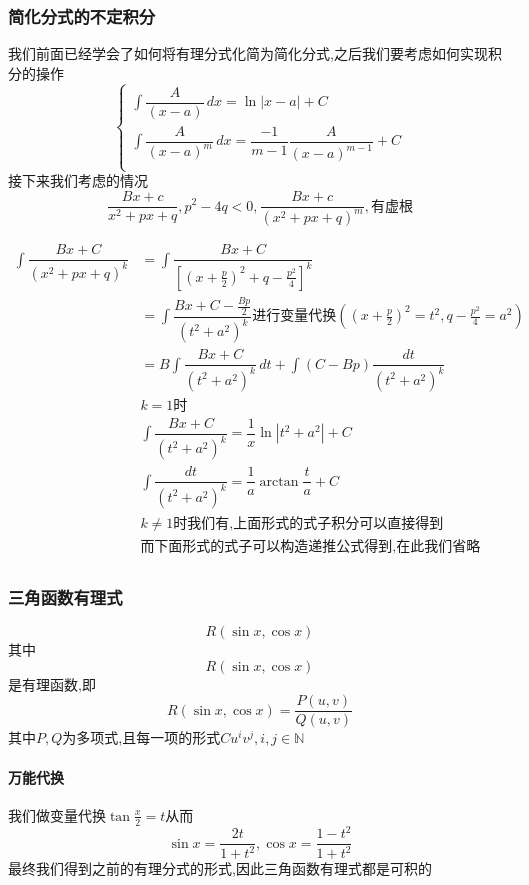 \documentclass[11pt,hyperref,a4paper,UTF8]{ctexart}
\newcommand{\NN}{\mathbb{N}}
\begin{document}
\begin{CJK}{UTF8}{gkai}
\subsubsection{简化分式的不定积分}

我们前面已经学会了如何将有理分式化简为简化分式,之后我们要考虑如何实现积分的操作\\
\begin{equation*}
  \begin{cases}
    \int\dfrac{A}{(x-a)}\,dx = \ln|x-a| + C\\
    \int\dfrac{A}{(x-a)^m}\,dx = \dfrac{-1}{m-1}\dfrac{A}{(x-a)^{m-1}} + C\\
  \end{cases}
\end{equation*}
接下来我们考虑的情况
\[\dfrac{Bx + c}{x^2 + px + q},p^2 - 4q < 0,\dfrac{Bx + c}{(x^2 + px + q)^m},\text{有虚根}\]

\[
\begin{aligned}  
\int\dfrac{Bx + C}{(x^2 + px + q)^k}&=\int\dfrac{Bx + C}{[(x+\frac{p}{2})^2 + q - \frac{p^2}{4}]^k}\\
&=\int\dfrac{Bx + C - \frac{Bp}{2}}{(t^2 + a^2)^k}\text{进行变量代换}((x+\frac{p}{2})^2 = t^2 ,q - \frac{p^2}{4} = a^2 )\\
&=B\int \dfrac{Bx + C}{(t^2 + a^2)^k}\, dt + \int(C - Bp)\dfrac{dt}{(t^2 + a^2)^k}\\
&k = 1\text{时}\\
&\int \dfrac{Bx + C}{(t^2 + a^2)^k} = \dfrac{1}{x}\ln|t^2 + a^2 | + C\\
&\int \dfrac{dt}{(t^2 + a^2)^k}=\dfrac{1}{a}\arctan \dfrac{t}{a} + C\\
&k \neq 1\text{时我们有,上面形式的式子积分可以直接得到}\\
&\text{而下面形式的式子可以构造递推公式得到,在此我们省略}\\
\end{aligned}
\]
\subsubsection{三角函数有理式}
\[R(\sin x,\cos x)\]
其中\[R(\sin x,\cos x)\]是有理函数,即\[R(\sin x,\cos x) =\dfrac{P(u,v)}{Q(u,v)}\]
其中$P,Q$为多项式,且每一项的形式$Cu^i v^j,i,j\in \NN$\\
\paragraph{万能代换}
我们做变量代换$\tan \frac{x}{2} = t$从而
\[\sin x = \dfrac{2t}{1 + t^2},\cos x =  \dfrac{1-t^2}{1+t^2}\]
最终我们得到之前的有理分式的形式,因此三角函数有理式都是可积的\\


\end{CJK}
\end{document}
